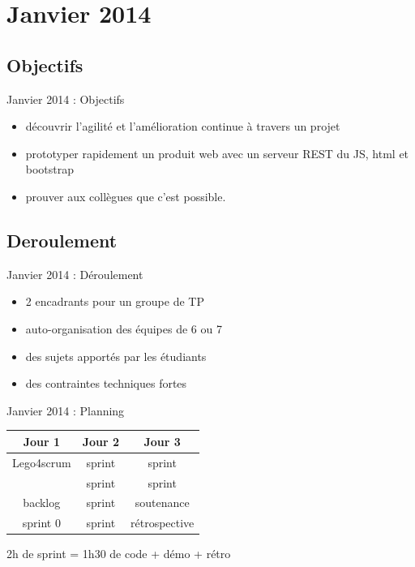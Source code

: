 \documentclass{beamer}
\begin{document}
\section{Janvier 2014}
\subsection{Objectifs}
\begin{frame}{Janvier 2014 : Objectifs}

  \begin{itemize}
    \item découvrir l'agilité et l'amélioration continue à travers un projet 
    \item prototyper rapidement un produit web avec un serveur REST du JS, html et bootstrap
    \item prouver aux collègues que c'est possible.
  \end{itemize}
\end{frame}

\subsection{Deroulement}
\begin{frame}{Janvier 2014 : Déroulement}
  \begin{itemize}
    \item 2 encadrants pour un groupe de TP
    \item auto-organisation des équipes de 6 ou 7
    \item des sujets apportés par les étudiants
    \item des contraintes techniques fortes
  \end{itemize}
\end{frame}

\begin{frame}{Janvier 2014 : Planning}
  \begin{center}
    \begin{tabular}{| c | c | c |}
      \hline
      \textbf{Jour 1} & \textbf{Jour 2} & \textbf{Jour 3} \\
      \hline \hline
      Lego4scrum & sprint & sprint        \\
      \hline
                 & sprint & sprint        \\
      \hline \hline
      backlog    & sprint & soutenance    \\
      \hline
      sprint 0   & sprint & rétrospective \\
      \hline
    \end{tabular}
  \end{center}
  2h de sprint = 1h30 de code + démo + rétro
\end{frame}
\end{document}
